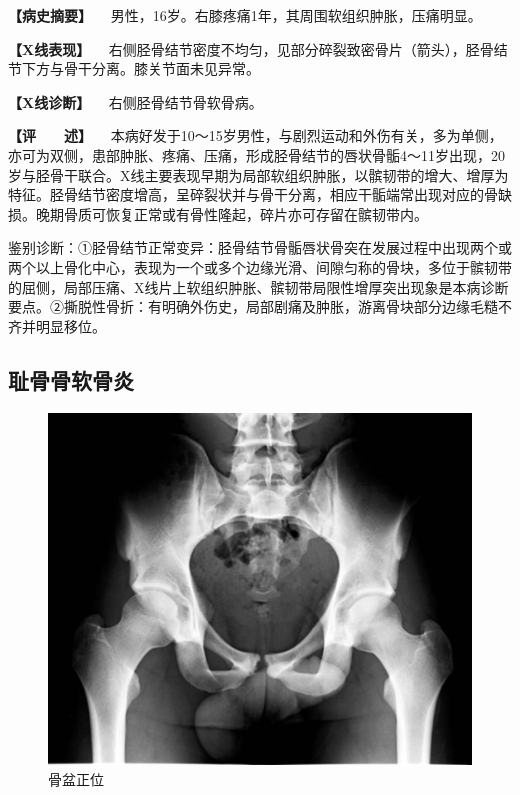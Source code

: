\textbf{【病史摘要】}
　男性，16岁。右膝疼痛1年，其周围软组织肿胀，压痛明显。

\textbf{【X线表现】}
　右侧胫骨结节密度不均匀，见部分碎裂致密骨片（箭头），胫骨结节下方与骨干分离。膝关节面未见异常。

\textbf{【X线诊断】} 　右侧胫骨结节骨软骨病。

\textbf{【评　　述】}
　本病好发于10～15岁男性，与剧烈运动和外伤有关，多为单侧，亦可为双侧，患部肿胀、疼痛、压痛，形成胫骨结节的唇状骨骺4～11岁出现，20岁与胫骨干联合。X线主要表现早期为局部软组织肿胀，以髌韧带的增大、增厚为特征。胫骨结节密度增高，呈碎裂状并与骨干分离，相应干骺端常出现对应的骨缺损。晚期骨质可恢复正常或有骨性隆起，碎片亦可存留在髌韧带内。

鉴别诊断：①胫骨结节正常变异：胫骨结节骨骺唇状骨突在发展过程中出现两个或两个以上骨化中心，表现为一个或多个边缘光滑、间隙匀称的骨块，多位于髌韧带的屈侧，局部压痛、X线片上软组织肿胀、髌韧带局限性增厚突出现象是本病诊断要点。②撕脱性骨折：有明确外伤史，局部剧痛及肿胀，游离骨块部分边缘毛糙不齐并明显移位。

\subsection{耻骨骨软骨炎}

\begin{figure}[!htbp]
 \centering
 \includegraphics{./images/Image00069.jpg}
 \captionsetup{justification=centering}
 \caption{骨盆正位}
 \label{fig2-4-8}
  \end{figure} 

